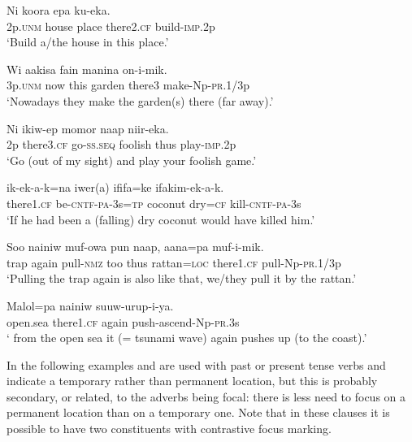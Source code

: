 \ea%
\label{ex:3:x465}
\gll Ni koora epa  ku-eka. \\
2p.\textsc{unm} house place there2.\textsc{cf} build-\textsc{imp}.2p\\
\glt`Build a/the house  in this place.'
\z

\ea%
\label{ex:3:x1214}
\gll Wi aakisa fain manina  on-i-mik. \\
3p.\textsc{unm} now this garden there3 make-Np-\textsc{pr}.1/3p\\
\glt`Nowadays they make the garden(s) there (far away).'
\z

\ea%
\label{ex:3:x1573}
\gll Ni  ikiw-ep momor naap niir-eka. \\
2p there3.\textsc{cf} go-\textsc{ss}.\textsc{seq} foolish thus play-\textsc{imp}.2p\\
\glt`Go  (out of my sight) and play your foolish game.'
\z

\ea%
\label{ex:3:x466}
\gll {} ik-ek-a-k=na iwer(a) ififa=ke ifakim-ek-a-k. \\
there1.\textsc{cf} be-\textsc{cntf}-\textsc{pa}-3s=\textsc{tp} coconut dry=\textsc{cf} kill-\textsc{cntf}-\textsc{pa}-3s\\
\glt`If he had been  a (falling) dry coconut would have killed him.'
\z

\ea%
\label{ex:3:x1197}
\gll Soo nainiw muf-owa pun naap, aana=pa  muf-i-mik. \\
trap again pull-\textsc{nmz} too thus rattan=\textsc{loc} there1.\textsc{cf} pull-Np-\textsc{pr}.1/3p\\
\glt`Pulling the trap again is also like that, we/they pull it  by the rattan.'
\z

\ea%
\label{ex:3:x1198}
\gll Malol=pa  nainiw suuw-urup-i-ya. \\
open.sea there1.\textsc{cf} again push-ascend-Np-\textsc{pr}.3s\\
\glt` from the open sea it (= tsunami wave) again pushes up (to the coast).'
\z

In the following examples  and are used with past or present tense verbs and indicate a temporary rather than permanent location, but this is probably secondary, or related, to the adverbs being focal: there is less need to focus on a permanent location than on a temporary one. Note that in these clauses it is possible to have two constituents with contrastive focus marking.

